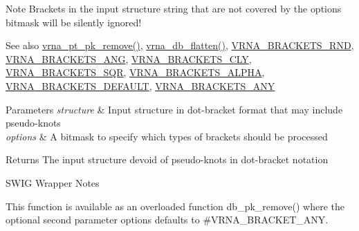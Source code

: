 \begin{DoxyNote}{Note}
Brackets in the input structure string that are not covered by the {\ttfamily options} bitmask will be silently ignored!
\end{DoxyNote}
\begin{DoxySeeAlso}{See also}
\mbox{\hyperlink{group__struct__utils__pair__table_gae8f31c859b48f97b8af889e914e4d040}{vrna\+\_\+pt\+\_\+pk\+\_\+remove()}}, \mbox{\hyperlink{group__struct__utils__dot__bracket_gafd1304f5a86e2e3f1425e725cde44fa2}{vrna\+\_\+db\+\_\+flatten()}}, \mbox{\hyperlink{group__struct__utils__dot__bracket_gac92d5fa7c6625bce2670ece510a24fbd}{V\+R\+N\+A\+\_\+\+B\+R\+A\+C\+K\+E\+T\+S\+\_\+\+R\+ND}}, \mbox{\hyperlink{group__struct__utils__dot__bracket_ga863e03f7f73f10fc9bbcbefbdda4bec8}{V\+R\+N\+A\+\_\+\+B\+R\+A\+C\+K\+E\+T\+S\+\_\+\+A\+NG}}, \mbox{\hyperlink{group__struct__utils__dot__bracket_gaf41be40e79cb756c4e0bb8edb4d803d2}{V\+R\+N\+A\+\_\+\+B\+R\+A\+C\+K\+E\+T\+S\+\_\+\+C\+LY}}, \mbox{\hyperlink{group__struct__utils__dot__bracket_ga60525d61d7496eeea490a37f3d6bf757}{V\+R\+N\+A\+\_\+\+B\+R\+A\+C\+K\+E\+T\+S\+\_\+\+S\+QR}}, \mbox{\hyperlink{group__struct__utils__dot__bracket_ga7e3f630af8d69bb0e917145aacf2f96d}{V\+R\+N\+A\+\_\+\+B\+R\+A\+C\+K\+E\+T\+S\+\_\+\+A\+L\+P\+HA}}, \mbox{\hyperlink{group__struct__utils__dot__bracket_ga559ebf76b1b289f85309f4206e99aa1a}{V\+R\+N\+A\+\_\+\+B\+R\+A\+C\+K\+E\+T\+S\+\_\+\+D\+E\+F\+A\+U\+LT}}, \mbox{\hyperlink{group__struct__utils__dot__bracket_ga013a9da903462d2f2b037f0c6ffb46e4}{V\+R\+N\+A\+\_\+\+B\+R\+A\+C\+K\+E\+T\+S\+\_\+\+A\+NY}}
\end{DoxySeeAlso}

\begin{DoxyParams}{Parameters}
{\em structure} & Input structure in dot-\/bracket format that may include pseudo-\/knots \\
\hline
{\em options} & A bitmask to specify which types of brackets should be processed \\
\hline
\end{DoxyParams}
\begin{DoxyReturn}{Returns}
The input structure devoid of pseudo-\/knots in dot-\/bracket notation
\end{DoxyReturn}
\begin{DoxyRefDesc}{S\+W\+I\+G Wrapper Notes}
\item[\mbox{\hyperlink{wrappers__wrappers000129}{S\+W\+I\+G Wrapper Notes}}]This function is available as an overloaded function {\ttfamily db\+\_\+pk\+\_\+remove()} where the optional second parameter {\ttfamily options} defaults to \#\+V\+R\+N\+A\+\_\+\+B\+R\+A\+C\+K\+E\+T\+\_\+\+A\+NY. \end{DoxyRefDesc}
